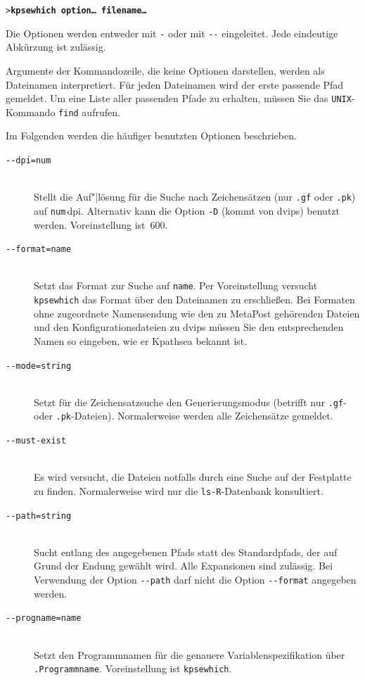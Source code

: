 \documentclass[12pt,ngerman,a4paper,fullparskip]{report}
\newcommand{\acro}[1]{\texttt{#1}}
\newcommand{\cmdname}[1]{\texttt{#1}}
\newcommand{\code}[1]{\texttt{#1}}
\newcommand{\file}[1]{\texttt{#1}}
\newcommand{\KPS}{Kpathsea\xspace}
\newcommand{\var}[1]{\texttt{#1}}
\newcommand{\samp}[1]{\texttt{#1}}
\newcommand{\Ucom}[1]{\textbf{\texttt{#1}}}
\def\MP{MetaPost}
\begin{document}
\begin{alltt}
> \Ucom{kpsewhich \var{option}{\dots} \var{filename}{\dots}}
\end{alltt}

Die Optionen werden entweder mit \samp{-} oder mit \samp{-{}-} eingeleitet.
Jede eindeutige Abkürzung ist zulässig.

Argumente der Kommandozeile, die keine Optionen darstellen, werden als
Datei\-na\-men interpretiert. Für jeden Dateinamen wird der erste passende
Pfad gemeldet. Um eine Liste aller passenden Pfade zu erhalten, müssen Sie
das \acro{UNIX}-Kommando \cmdname{find} aufrufen.

Im Folgenden werden die häufiger benutzten Optionen beschrieben.

\begin{description}
\item[\texttt{-{}-dpi=}\var{num}]\mbox{}\\
     Stellt die Auf"|lösung für die Suche nach Zeichensätzen
     (nur \file{.gf} oder \file{.pk}) auf \var{num}\,dpi. Alternativ
     kann die Option \code{-D} (kommt von dvips) benutzt werden.
     Voreinstellung ist~600.
\item[\texttt{-{}-format=}\var{name}]\mbox{}\\
     Setzt das Format zur Suche auf \var{name}. Per Voreinstellung
     versucht \cmdname{kpsewhich} das Format über den Dateinamen
     zu erschließen. Bei Formaten ohne zugeordnete Namens\-endung wie den
     zu {\MP} gehörenden Dateien und den Konfigurationsdateien zu
     {dvips} müssen Sie den entsprechenden Namen so eingeben, wie er
     \KPS{} bekannt ist.
\item[\texttt{-{}-mode=}\var{string}]\mbox{}\\
     Setzt für die Zeichensatzsuche den Generierungsmodus (betrifft nur
     \file{.gf}- oder \file{.pk}-Dateien). Normalerweise werden alle
     Zeichensätze gemeldet.
\item[\texttt{-{}-must-exist}]\mbox{}\\
     Es wird versucht, die Dateien notfalls durch eine Suche auf der
     Festplatte zu finden. Normalerweise wird nur die \file{ls-R}-Datenbank
     konsultiert.
\item[\texttt{-{}-path=}\var{string}]\mbox{}\\
     Sucht entlang des angegebenen Pfads statt des Standardpfads,
     der auf Grund der Endung gewählt wird. Alle Expansionen sind
     zulässig. Bei Verwendung der Option \texttt{-{}-path} darf nicht
     die Option \texttt{-{}-format} angegeben werden.
\item[\texttt{-{}-progname=}\var{name}]\mbox{}\\
     Setzt den Programmnamen für die genauere Variablenspezifikation
     über \newline  \code{.\var{Programmname}}. Voreinstellung ist \code{kpsewhich}.


\end{description}
\end{document}
